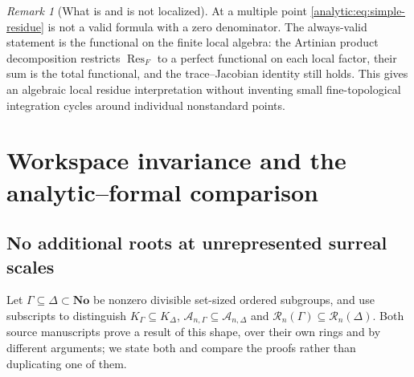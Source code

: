 \documentclass[11pt,letterpaper]{article}
\theoremstyle{definition}
\theoremstyle{remark}
\newtheorem{remark}[theorem]{Remark}
\newcommand{\No}{\mathbf{No}}
\newcommand{\A}{\mathscr A}
\newcommand{\RR}{\mathscr R}
\newcommand{\Res}{\operatorname{Res}}
\numberwithin{equation}{section}
\begin{document}
\begin{remark}[What is and is not localized]
\label{analytic:rem:localization}
At a multiple point \eqref{analytic:eq:simple-residue} is not a valid
formula with a zero denominator. The always-valid statement is the
functional on the finite local algebra: the Artinian product decomposition
restricts $\Res_F$ to a perfect functional on each local factor, their sum
is the total functional, and the trace--Jacobian identity still holds. This
gives an algebraic local residue interpretation without inventing small
fine-topological integration cycles around individual nonstandard points.
\end{remark}

\section{Workspace invariance and the analytic--formal comparison}
\label{analytic:sec:extension}

\subsection{No additional roots at unrepresented surreal scales}
\label{analytic:subsec:workspace-invariance}
Let $\Gamma\subseteq\Delta\subset\No$ be nonzero divisible set-sized
ordered subgroups, and use subscripts to distinguish
$K_\Gamma\subseteq K_\Delta$, $\A_{n,\Gamma}\subseteq\A_{n,\Delta}$ and
$\RR_n(\Gamma)\subseteq\RR_n(\Delta)$. Both source manuscripts prove a
result of this shape, over their own rings and by different arguments; we
state both and compare the proofs rather than duplicating one of them.
\end{document}
